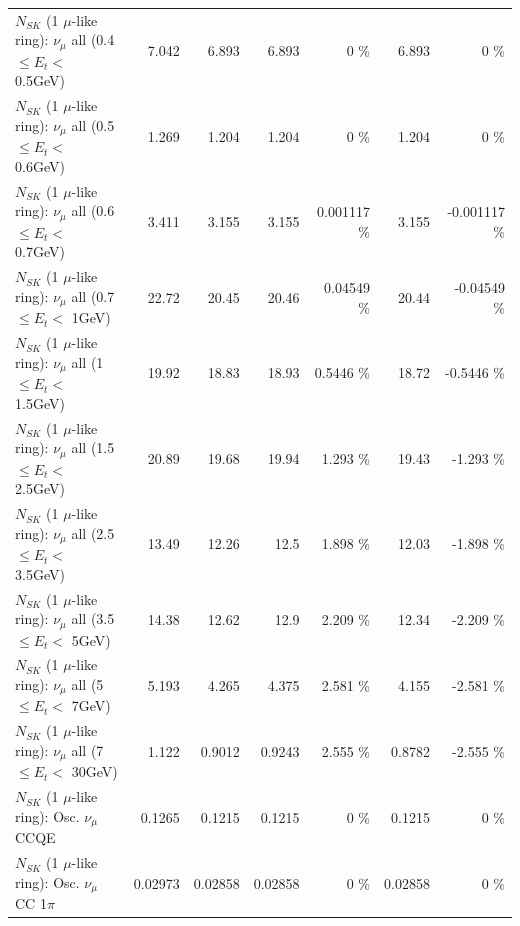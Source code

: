 \begin{table}
\begin{tabular}{| l | r | r | r  r | r  r |}
       $N_{SK}$ (1 $\mu$-like ring): $\nu_{\mu}$ all (0.4 $\leq E_{t} <$ 0.5GeV) &           7.042 &           6.893 &           6.893 &        0 \%  &           6.893 &        0 \%  \\ 
       $N_{SK}$ (1 $\mu$-like ring): $\nu_{\mu}$ all (0.5 $\leq E_{t} <$ 0.6GeV) &           1.269 &           1.204 &           1.204 &        0 \%  &           1.204 &        0 \%  \\ 
       $N_{SK}$ (1 $\mu$-like ring): $\nu_{\mu}$ all (0.6 $\leq E_{t} <$ 0.7GeV) &           3.411 &           3.155 &           3.155 & 0.001117 \%  &           3.155 & -0.001117 \%  \\ 
         $N_{SK}$ (1 $\mu$-like ring): $\nu_{\mu}$ all (0.7 $\leq E_{t} <$ 1GeV) &           22.72 &           20.45 &           20.46 &  0.04549 \%  &           20.44 & -0.04549 \%  \\ 
         $N_{SK}$ (1 $\mu$-like ring): $\nu_{\mu}$ all (1 $\leq E_{t} <$ 1.5GeV) &           19.92 &           18.83 &           18.93 &   0.5446 \%  &           18.72 &  -0.5446 \%  \\ 
       $N_{SK}$ (1 $\mu$-like ring): $\nu_{\mu}$ all (1.5 $\leq E_{t} <$ 2.5GeV) &           20.89 &           19.68 &           19.94 &    1.293 \%  &           19.43 &   -1.293 \%  \\ 
       $N_{SK}$ (1 $\mu$-like ring): $\nu_{\mu}$ all (2.5 $\leq E_{t} <$ 3.5GeV) &           13.49 &           12.26 &            12.5 &    1.898 \%  &           12.03 &   -1.898 \%  \\ 
         $N_{SK}$ (1 $\mu$-like ring): $\nu_{\mu}$ all (3.5 $\leq E_{t} <$ 5GeV) &           14.38 &           12.62 &            12.9 &    2.209 \%  &           12.34 &   -2.209 \%  \\ 
           $N_{SK}$ (1 $\mu$-like ring): $\nu_{\mu}$ all (5 $\leq E_{t} <$ 7GeV) &           5.193 &           4.265 &           4.375 &    2.581 \%  &           4.155 &   -2.581 \%  \\ 
          $N_{SK}$ (1 $\mu$-like ring): $\nu_{\mu}$ all (7 $\leq E_{t} <$ 30GeV) &           1.122 &          0.9012 &          0.9243 &    2.555 \%  &          0.8782 &   -2.555 \%  \\ 
\hline
\hline
                               $N_{SK}$ (1 $\mu$-like ring): Osc. $\nu_\mu$ CCQE &          0.1265 &          0.1215 &          0.1215 &        0 \%  &          0.1215 &        0 \%  \\ 
                          $N_{SK}$ (1 $\mu$-like ring): Osc. $\nu_\mu$ CC 1$\pi$ &         0.02973 &         0.02858 &         0.02858 &        0 \%  &         0.02858 &        0 \%  \\ 

\end{tabular}
\end{table}
